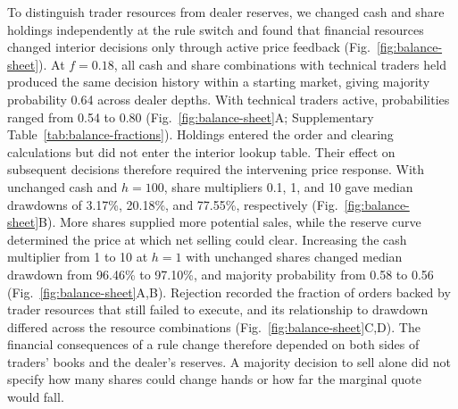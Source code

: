 To distinguish trader resources from dealer reserves, we changed cash
and share holdings independently at the rule switch and found that
financial resources changed interior decisions only through active
price feedback (Fig.~\ref{fig:balance-sheet}). At $f=0.18$, all
cash and share combinations with technical traders held produced the
same decision history within a starting market, giving majority
probability 0.64 across dealer depths. With technical traders
active, probabilities ranged from 0.54
to 0.80
(Fig.~\ref{fig:balance-sheet}A; Supplementary Table~\ref{tab:balance-fractions}).
Holdings entered the order and clearing calculations but did not enter
the interior lookup table. Their effect on subsequent decisions therefore
required the intervening price response. With unchanged cash and $h=100$,
share multipliers 0.1, 1, and 10 gave median drawdowns of
3.17\%, 20.18\%, and 77.55\%,
respectively (Fig.~\ref{fig:balance-sheet}B). More shares supplied
more potential sales, while the reserve curve determined the price
at which net selling could clear. Increasing the cash multiplier from 1
to 10 at $h=1$ with unchanged shares changed median drawdown from 96.46\%
to 97.10\%, and majority probability from
0.58 to 0.56
(Fig.~\ref{fig:balance-sheet}A,B). Rejection recorded the fraction
of orders backed by trader resources that still failed to execute,
and its relationship to drawdown differed across the resource
combinations (Fig.~\ref{fig:balance-sheet}C,D). The financial
consequences of a rule change therefore depended on both sides of
traders' books and the dealer's reserves. A majority decision to sell
alone did not specify how many shares could change hands or how far
the marginal quote would fall.
